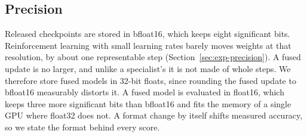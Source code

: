\subsection{Precision}
\label{sec:precision}

Released checkpoints are stored in bfloat16, which keeps eight significant
bits. Reinforcement learning with small learning rates barely moves weights at
that resolution, by about one representable step
(Section~\ref{sec:exp-precision}). A fused update is no larger, and unlike a
specialist's it is not made of whole steps. We therefore store fused models
in 32-bit floats, since rounding the fused update to bfloat16 measurably
distorts it. A fused model is evaluated in float16, which keeps three more
significant bits than bfloat16 and fits the memory of a single GPU where
float32 does not. A format change by itself shifts measured accuracy, so we
state the format behind every score.
